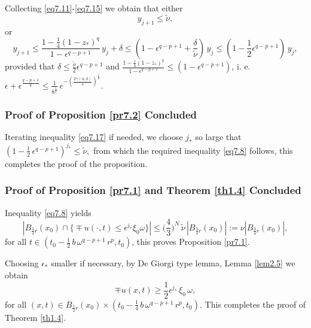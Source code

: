 \documentclass[a4paper,11pt,fullpage]{article}
\numberwithin{equation}{section}
\begin{document}
Collecting \eqref{eq7.11}-\eqref{eq7.15} we obtain that either
\begin{equation}\label{eq7.16}
y_{j+1}\leqslant \tilde{\nu},
\end{equation}
or
\begin{equation}\label{eq7.17}
y_{j+1}\leqslant \frac{1-\frac{1}{4}(1-z_*)^q}{1-\epsilon^{q-p+1}}\,y_j+\delta\leqslant (1-\epsilon^{q-p+1}+\frac{\delta}{\tilde{\nu}})\,y_j
\leqslant (1-\frac{1}{2}\epsilon^{q-p+1})\,y_j,
\end{equation}
provided that  $\delta\leqslant \frac{\tilde{\nu}}{2}\epsilon^{q-p+1}$ and $\frac{1-\frac{1}{4}(1-z_*)^q}{1-\epsilon^{q-p+1}} \leqslant (1-\epsilon^{q-p+1})$, i. e. $\epsilon+\epsilon^{\frac{q-p+1}{q}}\leqslant \frac{1}{8^{\frac{1}{q}}}\,e^{-(\frac{2\gamma(\alpha, b)}{\nu})^{\frac{1}{p}}}.$

\subsubsection{Proof of Proposition \ref{pr7.2} Concluded}

Iterating  inequality \eqref{eq7.17} if needed, we choose $j_*$ so large that $(1-\frac{1}{2}\,\epsilon^{q-p+1})^{j_*}\leqslant \tilde{\nu},$ from which the required inequality \eqref{eq7.8}
follows, this completes the proof of the proposition.

\subsubsection{Proof of Proposition \ref{pr7.1} and Theorem \ref{th1.4} Concluded}

Inequality \eqref{eq7.8} yields
\begin{equation*}
 |B_{\frac{3}{4}r}(x_0)\cap\big\{\mp u(\cdot, t)\leqslant \epsilon^{j_*}\xi_0\omega\big\}|\leqslant  \Big(\frac{4}{3}\Big)^N\,\tilde{\nu}\,|B_{\frac{3}{4}r}(x_0)|:=\nu |B_{\frac{3}{4} r}(x_0)|,
\end{equation*}
for all $t\in (t_0-\frac{1}{2}\,b\,\omega^{q-p+1}\,r^p, t_0)$,  this proves Proposition \ref{pr7.1}.

Choosing $\epsilon_*$ smaller if necessary, by De Giorgi type lemma, Lemma \ref{lem2.5} we obtain
$$\mp u(x, t)\geqslant \frac{1}{2}\epsilon^{j_*}\,\xi_0\,\omega,$$
for all $(x, t)\in B_{\frac{1}{2} r}(x_0)\times (t_0-\frac{1}{4}\,b\,\omega^{q-p+1}\,r^p, t_0).$ This completes the proof of Theorem \ref{th1.4}.
\end{document}
